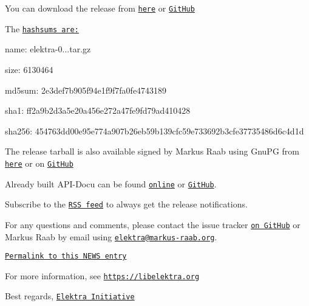 You can download the release from \href{https://www.libelektra.org/ftp/elektra/releases/elektra-0.8.24.tar.gz}{\tt here} or \href{https://github.com/ElektraInitiative/ftp/blob/master/releases/elektra-0.8.24.tar.gz?raw=true}{\tt Git\+Hub}

The \href{https://github.com/ElektraInitiative/ftp/blob/master/releases/elektra-0.8.24.tar.gz.hashsum?raw=true}{\tt hashsums are\+:}


\begin{DoxyItemize}
\item name\+: elektra-\/0...\+tar.\+gz
\item size\+: 6130464
\item md5sum\+: 2e3def7b905f94e1f9f7fa0fe4743189
\item sha1\+: ff2a9b2d3a5e20a456e272a47fe9fd79ad410428
\item sha256\+: 454763dd00e95e774a907b26eb59b139cfc59e733692b3cfe37735486d6c4d1d
\end{DoxyItemize}

The release tarball is also available signed by Markus Raab using Gnu\+PG from \href{https://www.libelektra.org/ftp/elektra/releases/elektra-0.8.24.tar.gz.gpg}{\tt here} or on \href{https://github.com/ElektraInitiative/ftp/blob/master/releases//elektra-0.8.24.tar.gz.gpg?raw=true}{\tt Git\+Hub}

Already built A\+P\+I-\/\+Docu can be found \href{https://doc.libelektra.org/api/0.8.24/html/}{\tt online} or \href{https://github.com/ElektraInitiative/doc/tree/master/api/0.8.24}{\tt Git\+Hub}.

Subscribe to the \href{https://www.libelektra.org/news/feed.rss}{\tt R\+SS feed} to always get the release notifications.

For any questions and comments, please contact the issue tracker \href{http://issues.libelektra.org}{\tt on Git\+Hub} or Markus Raab by email using \href{mailto:elektra@markus-raab.org}{\tt elektra@markus-\/raab.\+org}.

\href{https://www.libelektra.org/news/0.8.24-release}{\tt Permalink to this N\+E\+WS entry}

For more information, see \href{https://libelektra.org}{\tt https\+://libelektra.\+org}

Best regards, \href{https://www.libelektra.org/developers/authors}{\tt Elektra Initiative} 
